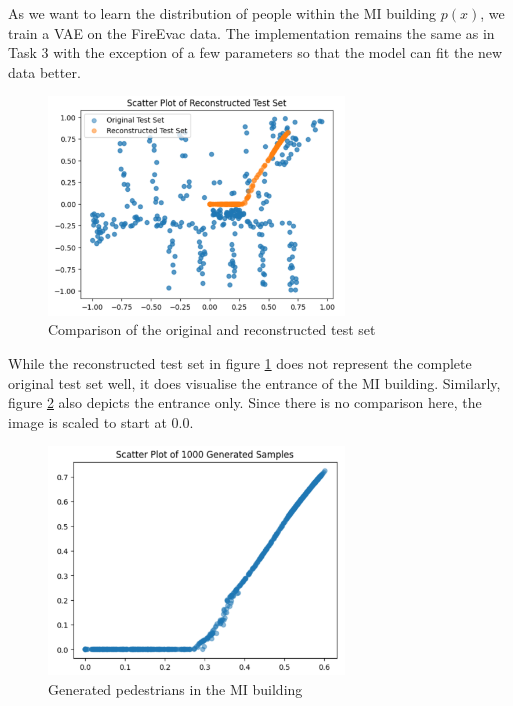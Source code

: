 As we want to learn the distribution of people within the MI building $p(x)$, we train a VAE on the FireEvac data. The implementation remains the same as in Task 3 with the exception of a few parameters so that the model can fit the new data better. 


\begin{figure}[H]
    \centering
    \includegraphics[width=0.7\textwidth]{images/3-scatterReconstructed.png}
    \caption{Comparison of the original and reconstructed test set}
    \label{fig:scatterReconstructed}
\end{figure}

While the reconstructed test set in figure \ref{fig:scatterReconstructed} does not represent the complete original test set well, it does visualise the entrance of the MI building. 
Similarly, figure \ref{fig:scatterGenerated} also depicts the entrance only. Since there is no comparison here, the image is scaled to start at 0.0. 

\begin{figure}[H]
    \centering
    \includegraphics[width=0.7\textwidth]{images/3-scatterGenerated.png}
    \caption{Generated pedestrians in the MI building}
    \label{fig:scatterGenerated}
\end{figure}

